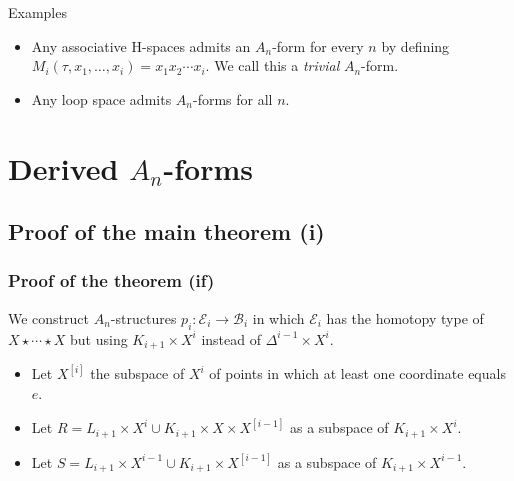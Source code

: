 \documentclass{beamer}
\theoremstyle{definition}
\begin{document}
\begin{frame}
\begin{block}{Examples}
\begin{itemize}
\item<1->Any associative H-spaces admits an $A_n$-form for every $n$ by defining $M_i(\tau,x_1,\dots,x_i)=x_1x_2\cdots x_i$. We call this a \emph{trivial} $A_n$-form.
\item<2-> Any loop space admits $A_n$-forms for all $n$.
\end{itemize}
\end{block}

\end{frame}


\section{Derived $A_n$-forms}
\subsection{Proof of the main theorem (i)}
\begin{frame}
\frametitle{Proof of the theorem (if)}
We construct $A_n$-structures $p_i:\mathcal{E}_i\to \mathcal{B}_i$ in which $\mathcal{E}_i$ has the homotopy type of $X\star\cdots\star X$ but using $K_{i+1}\times X^i$ instead of $\Delta^{i-1}\times X^i$.
\begin{itemize}
\item<2-> Let $X^{[i]}$ the subspace of $X^i$ of points in which at least one coordinate equals $e$.
\item<3-> Let $R=L_{i+1}\times X^i\cup K_{i+1}\times X\times X^{[i-1]}$ as a subspace of $K_{i+1}\times X^i$.
\item<4-> Let $S=L_{i+1}\times X^{i-1}\cup K_{i+1}\times X^{[i-1]}$ as a subspace of $K_{i+1}\times X^{i-1}$.
\end{itemize}
\end{frame}
\end{document}
